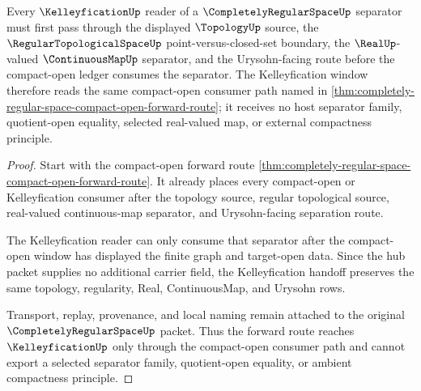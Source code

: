 \begin{theorem}
\label{thm:completely-regular-space-kelleyfication-forward-route}
Every $\KelleyficationUp$ reader of a $\CompletelyRegularSpaceUp$ separator must first pass through the displayed $\TopologyUp$ source, the $\RegularTopologicalSpaceUp$ point-versus-closed-set boundary, the $\RealUp$-valued $\ContinuousMapUp$ separator, and the Urysohn-facing route before the compact-open ledger consumes the separator. The Kelleyfication window therefore reads the same compact-open consumer path named in \autoref{thm:completely-regular-space-compact-open-forward-route}; it receives no host separator family, quotient-open equality, selected real-valued map, or external compactness principle.
\end{theorem}
\begin{proof}
Start with the compact-open forward route \autoref{thm:completely-regular-space-compact-open-forward-route}. It already places every compact-open or Kelleyfication consumer after the topology source, regular topological source, real-valued continuous-map separator, and Urysohn-facing separation route.

The Kelleyfication reader can only consume that separator after the compact-open window has displayed the finite graph and target-open data. Since the hub packet supplies no additional carrier field, the Kelleyfication handoff preserves the same topology, regularity, Real, ContinuousMap, and Urysohn rows.

Transport, replay, provenance, and local naming remain attached to the original $\CompletelyRegularSpaceUp$ packet. Thus the forward route reaches $\KelleyficationUp$ only through the compact-open consumer path and cannot export a selected separator family, quotient-open equality, or ambient compactness principle.
\end{proof}
